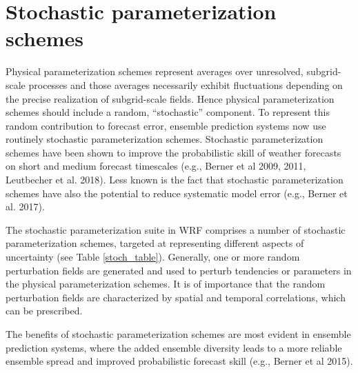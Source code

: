 \chapter{Stochastic parameterization schemes}
\label{stoch}

Physical parameterization schemes represent averages over unresolved,
subgrid-scale processes and those averages necessarily exhibit
fluctuations depending on the precise realization of subgrid-scale
fields.  Hence physical parameterization schemes should include a random,
``stochastic'' component.  To represent this random contribution to
forecast error, ensemble prediction systems now use routinely stochastic
parameterization schemes.
Stochastic parameterization schemes have been shown to improve the
probabilistic skill of weather forecasts on short and medium forecast
timescales (e.g., Berner et al 2009, 2011, Leutbecher et al. 2018).  Less
known is the fact that stochastic parameterization schemes have also the
potential to reduce systematic model error (e.g., Berner et al. 2017).

The stochastic parameterization suite in WRF comprises a number of
stochastic parameterization schemes, targeted at representing different aspects 
of uncertainty (see Table \ref{stoch_table}). Generally, one or more random
perturbation fields are generated and used to perturb tendencies or
parameters in the physical parameterization schemes.  It is of importance
that the random perturbation fields are characterized by spatial and temporal
correlations, which can be prescribed.

The benefits of stochastic parameterization schemes are most evident in ensemble 
prediction systems, where the added ensemble diversity leads to a more reliable 
ensemble spread and improved probabilistic forecast skill (e.g., Berner et al 2015).


